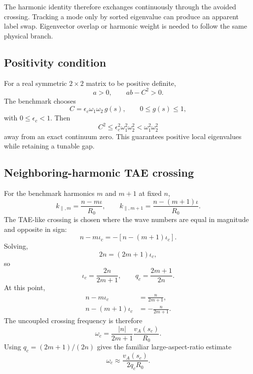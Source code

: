 The harmonic identity therefore exchanges continuously through the avoided crossing. Tracking a mode only by sorted eigenvalue can produce an apparent label swap. Eigenvector overlap or harmonic weight is needed to follow the same physical branch.

\subsection{Positivity condition}
For a real symmetric $2\times2$ matrix to be positive definite,
\begin{equation}
a>0,
\qquad
ab-C^2>0.
\label{eq:two_mode_positivity}
\end{equation}
The benchmark chooses
\begin{equation}
C=\epsilon_c\omega_1\omega_2\,g(s),
\qquad
0\le g(s)\le1,
\end{equation}
with $0\le\epsilon_c<1$. Then
\begin{equation}
C^2\le\epsilon_c^2\omega_1^2\omega_2^2<\omega_1^2\omega_2^2
\end{equation}
away from an exact continuum zero. This guarantees positive local eigenvalues while retaining a tunable gap.

\subsection{Neighboring-harmonic TAE crossing}
For the benchmark harmonics $m$ and $m+1$ at fixed $n$,
\begin{equation}
k_{\parallel,m}=\frac{n-m\iota}{R_0},
\qquad
k_{\parallel,m+1}=\frac{n-(m+1)\iota}{R_0}.
\end{equation}
The TAE-like crossing is chosen where the wave numbers are equal in magnitude and opposite in sign:
\begin{equation}
n-m\iota_c=-\left[n-(m+1)\iota_c\right].
\end{equation}
Solving,
\begin{equation}
2n=(2m+1)\iota_c,
\end{equation}
so
\begin{equation}
\boxed{\iota_c=\frac{2n}{2m+1},
\qquad
q_c=\frac{2m+1}{2n}.}
\label{eq:tae_crossing_iota}
\end{equation}
At this point,
\begin{align}
n-m\iota_c&=\frac{n}{2m+1},\\
n-(m+1)\iota_c&=-\frac{n}{2m+1}.
\end{align}
The uncoupled crossing frequency is therefore
\begin{equation}
\omega_c=\frac{|n|}{2m+1}\frac{v_A(s_c)}{R_0}.
\label{eq:crossing_frequency_general}
\end{equation}
Using $q_c=(2m+1)/(2n)$ gives the familiar large-aspect-ratio estimate
\begin{equation}
\boxed{\omega_c\approx\frac{v_A(s_c)}{2q_cR_0}.}
\label{eq:tae_gap_center}
\end{equation}

